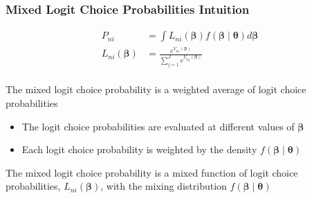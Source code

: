 \documentclass{beamer}
\begin{document}
\begin{frame}\frametitle{Mixed Logit Choice Probabilities Intuition}
	\begin{align*}
        P_{ni} & = \int L_{ni}(\bm{\beta}) f(\bm{\beta} \mid \bm{\theta}) d \bm{\beta} \\
        L_{ni}(\bm{\beta}) & = \frac{e^{V_{ni}(\bm{\beta})}}{\sum_{j = 1}^J e^{V_{nj}(\bm{\beta})}}
    \end{align*} \\
	\vspace{3ex}
	The mixed logit choice probability is a weighted average of logit choice probabilities
	\begin{itemize}
		\item The logit choice probabilities are evaluated at different values of $\bm{\beta}$
		\item Each logit choice probability is weighted by the density $f(\bm{\beta} \mid \bm{\theta})$
	\end{itemize}
	\vspace{3ex}
	The mixed logit choice probability is a mixed function of logit choice probabilities, $L_{ni}(\bm{\beta})$, with the mixing distribution $f(\bm{\beta} \mid \bm{\theta})$
\end{frame}
\end{document}
